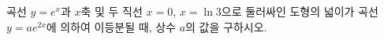 \hspace*{2mm}\begin{minipage}[t]{\dimexpr\linewidth-2mm\relax}\vspace{0pt}
곡선 $y=e^x$과 $x$축 및 두 직선 $x=0$, $x=\ln 3$으로 둘러싸인 도형의 넓이가 곡선 $y=ae^{2x}$에 의하여 이등분될 때, 상수 $a$의 값을 구하시오. \end{minipage}
